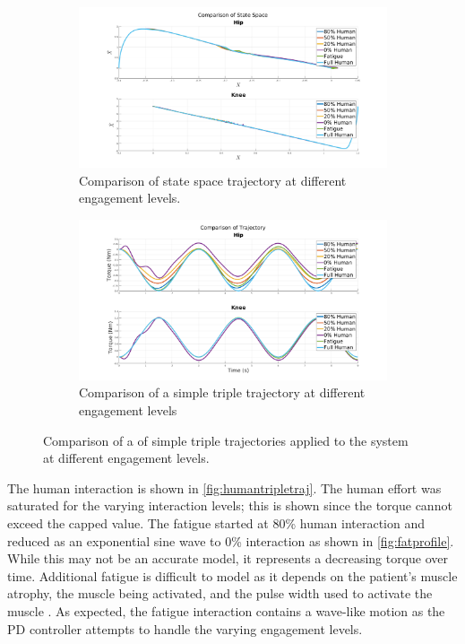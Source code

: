 \begin{figure}
    \centering
    \begin{subfigure}{\linewidth}
        \centering
        \includegraphics[width=\columnwidth]{images/controllers/trajs/statespace.png}
        \caption[State Space Trajectory]{Comparison of state space trajectory at different engagement levels.}
        \label{fig:StateSpaceTrajectory}
    \end{subfigure}
    \begin{subfigure}{\linewidth}
        \centering
        \includegraphics[width=\columnwidth]{images/controllers/trajs/triple_traj.png}
        \caption[Triple Trajectory]{Comparison of a simple triple trajectory at different engagement levels}
        \label{fig:TripleTrajectory}
    \end{subfigure}
    \caption[Triple Trajectory LARRE]{Comparison of a of simple triple trajectories applied to the system at different engagement levels.}
    \label{fig:TripleTraj}
\end{figure}



The human interaction is shown in \autoref{fig:humantripletraj}. The human effort was saturated for the varying interaction levels; this is shown since the torque cannot exceed the capped value. The fatigue started at 80\% human interaction and reduced as an exponential sine wave to 0\% interaction as shown in \autoref{fig:fatprofile}. While this may not be an accurate model, it represents a decreasing torque over time. Additional fatigue is difficult to model as it depends on the patient's muscle atrophy, the muscle being activated, and the pulse width used to activate the muscle \cite{reiner1998patient}. As expected, the fatigue interaction contains a wave-like motion as the PD controller attempts to handle the varying engagement levels. 


